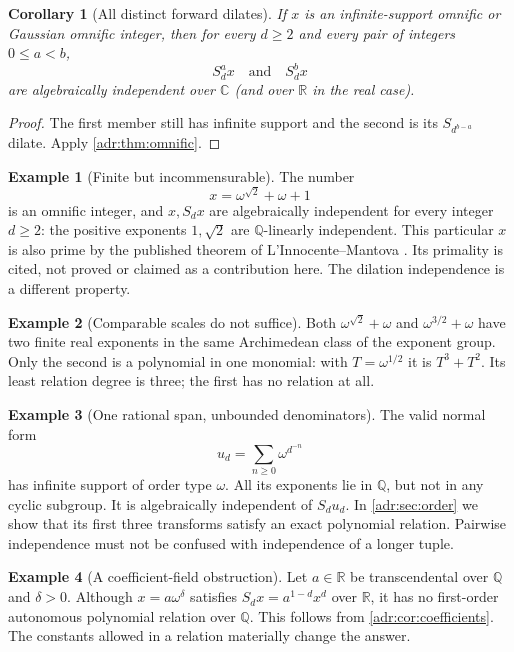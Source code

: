 \documentclass[11pt,letterpaper]{article}
\numberwithin{equation}{section}
\newtheorem{corollary}[corollary]{Corollary}
\theoremstyle{definition}
\newtheorem{example}[example]{Example}
\theoremstyle{remark}
\newcommand{\C}{\mathbb C}
\newcommand{\R}{\mathbb R}
\newcommand{\Q}{\mathbb Q}
\begin{document}
\begin{corollary}[All distinct forward dilates]\label{adr:cor:pairs}
If $x$ is an infinite-support omnific or Gaussian omnific integer, then
for every $d\ge2$ and every pair of integers $0\le a<b$,
\[
 S_d^a x\quad\text{and}\quad S_d^b x
\]
are algebraically independent over $\C$ (and over $\R$ in the real case).
\end{corollary}
\begin{proof}
The first member still has infinite support and the second is its
$S_{d^{b-a}}$ dilate. Apply \cref{adr:thm:omnific}.
\end{proof}

\begin{example}[Finite but incommensurable]
The number
\[
 x=\omega^{\sqrt2}+\omega+1
\]
is an omnific integer, and $x,S_dx$ are algebraically independent for
every integer $d\ge2$: the positive exponents $1,\sqrt2$ are
$\Q$-linearly independent. This particular $x$ is also prime by the
published theorem of L'Innocente--Mantova \cite[Theorem~B]{LM}.
Its primality is cited, not proved or claimed as a contribution here.
The dilation independence is a different property.
\end{example}

\begin{example}[Comparable scales do not suffice]
Both
$\omega^{\sqrt2}+\omega$ and $\omega^{3/2}+\omega$
have two finite real exponents in the same Archimedean class of the
exponent group. Only the second is a polynomial in one monomial:
with $T=\omega^{1/2}$ it is $T^3+T^2$. Its least relation degree is
three; the first has no relation at all.
\end{example}

\begin{example}[One rational span, unbounded denominators]
The valid normal form
\[
 u_d=\sum_{n\ge0}\omega^{d^{-n}}
\]
has infinite support of order type $\omega$. All its exponents lie in
$\Q$, but not in any cyclic subgroup. It is algebraically independent
of $S_du_d$. In \cref{adr:sec:order} we show that its first three transforms
satisfy an exact polynomial relation. Pairwise independence must not be
confused with independence of a longer tuple.
\end{example}

\begin{example}[A coefficient-field obstruction]
Let $a\in\R$ be transcendental over $\Q$ and $\delta>0$. Although
$x=a\omega^\delta$ satisfies
$S_dx=a^{1-d}x^d$ over $\R$, it has no first-order autonomous polynomial
relation over $\Q$. This follows from \cref{adr:cor:coefficients}.
The constants allowed in a relation materially change the answer.
\end{example}
\end{document}
